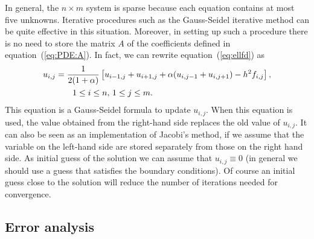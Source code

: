 In general, the $n\times m$ system is sparse because each equation
contains at most five unknowns.  Iterative procedures such as the
Gauss-Seidel iterative method can be quite effective in this
situation.  Moreover, in setting up such a procedure there is no need
to store the matrix $A$ of the coefficients defined in
equation~(\ref{eq:PDE:A}).  In fact, we can rewrite
equation~(\ref{eq:ellfd}) as
%
\begin{align}
  u_{i,j} &= \frac{1}{2(1+\alpha)} \left [ u_{i-1,j} +u_{i+1,j} +
    \alpha (u_{i,j-1}+u_{i,j+1}) - h^2 f_{i,j} \right ],
    \label{PDE:eq:Ell:Updateuij} \\ & \notag \qquad
  1 \le i \le n, \, 1 \le j \le m .
\end{align}
%
This equation is a Gauss-Seidel formula to update $u_{i,j}$. When this
equation is used, the value obtained from the right-hand side replaces
the old value of $u_{i,j}$.  It can also be seen as an implementation
of Jacobi's method, if we assume that the variable on the left-hand
side are stored separately from those on the right hand side.  As
initial guess of the solution we can assume that $u_{i,j} \equiv 0$
(in general we should use a guess that satisfies the boundary
conditions).  Of course an initial guess close to the solution will
reduce the number of iterations needed for convergence.

\subsection{Error analysis}

